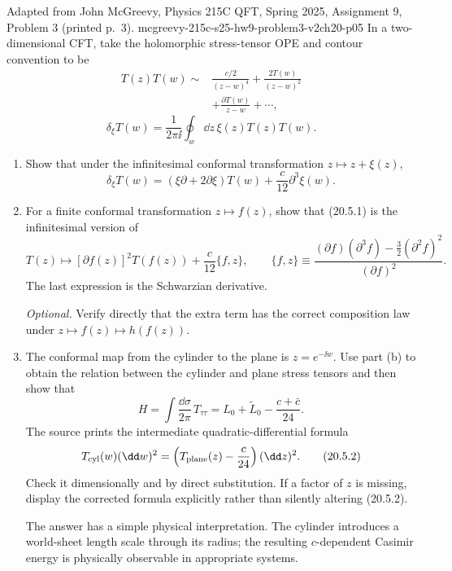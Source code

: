 \begin{enumerate}
  {Adapted from John McGreevy, Physics 215C QFT, Spring 2025,
  Assignment 9, Problem 3 (printed p.~3).}
  {mcgreevy-215c-s25-hw9-problem3-v2ch20-p05}
  In a two-dimensional CFT, take the holomorphic stress-tensor OPE and
  contour convention to be
  \[
  \begin{split}
    T(z)T(w)\sim{}&
      \frac{c/2}{(z-w)^4}
      +\frac{2T(w)}{(z-w)^2}\\
      &+\frac{\partial T(w)}{z-w}+\cdots ,
  \end{split}
  \]
  \[
    \delta_\xi T(w)=\frac{1}{2\pi \ii}\oint_w \dd z\,
      \xi(z)T(z)T(w).
  \]
  \begin{enumerate}
    \item[(a)]
    Show that under the infinitesimal conformal transformation
    \(z\mapsto z+\xi(z)\),
    \[
      \delta_\xi T(w)
        =(\xi\partial+2\partial\xi)T(w)
          +\frac{c}{12}\partial^3\xi(w).
      \tag{20.5.1}
    \]

    \item[(b)]
    For a finite conformal transformation \(z\mapsto f(z)\), show that
    (20.5.1) is the infinitesimal version of
    \[
      T(z)\longmapsto
        [\partial f(z)]^2T(f(z))+\frac{c}{12}\{f,z\},
      \qquad
      \{f,z\}\equiv
        \frac{(\partial f)(\partial^3 f)
          -\tfrac32(\partial^2f)^2}{(\partial f)^2}.
    \]
    The last expression is the Schwarzian derivative.

    \emph{Optional.} Verify directly that the extra term has the correct
    composition law under
    \(z\mapsto f(z)\mapsto h(f(z))\).

    \item[(c)]
    The conformal map from the cylinder to the plane is
    \(z=e^{-\ii w}\).  Use part (b) to obtain the relation between the
    cylinder and plane stress tensors and then show that
    \[
      H=\int\frac{\dd\sigma}{2\pi}\,T_{\tau\tau}
       =L_0+\widetilde L_0-\frac{c+\bar c}{24}.
    \]
    The source prints the intermediate quadratic-differential formula
    \[
      T_{\rm cyl}(w)(\dd w)^2
        =\left(T_{\rm plane}(z)-\frac{c}{24}\right)(\dd z)^2.
      \tag{20.5.2}
    \]
    Check it dimensionally and by direct substitution.  If a factor of
    \(z\) is missing, display the corrected formula explicitly rather
    than silently altering (20.5.2).

    The answer has a simple physical interpretation.  The cylinder
    introduces a world-sheet length scale through its radius; the
    resulting \(c\)-dependent Casimir energy is physically observable in
    appropriate systems.
  \end{enumerate}


\end{enumerate}

